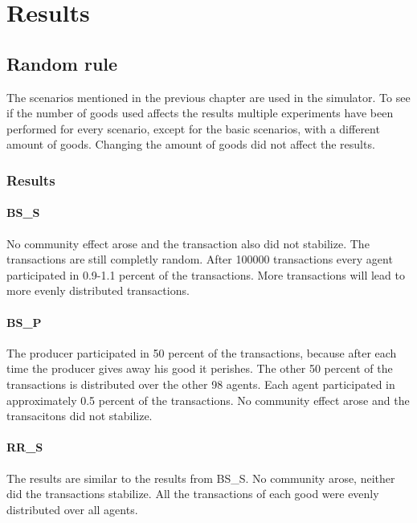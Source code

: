 \documentclass[twoside,openright]{uva-bachelor-thesis}
\begin{document}
\chapter{Results}

\section{Random rule}
The scenarios mentioned in the previous chapter are used in the simulator. To see if the number of goods used affects the results multiple experiments have been performed for every scenario, except for the basic scenarios, with a different amount of goods. Changing the amount of goods did not affect the results.
\subsection{Results}

\subsubsection{BS\_S}
No community effect arose and the transaction also did not stabilize. The transactions are still completly random. After 100000 transactions every agent participated in 0.9-1.1 percent of the transactions. More transactions will lead to more evenly distributed transactions.

\subsubsection{BS\_P}
The producer participated in 50 percent of the transactions, because after each time the producer gives away his good it perishes. The other 50 percent of the transactions is distributed over the other 98 agents. Each agent participated in approximately 0.5 percent of the transactions. No community effect arose and the transacitons did not stabilize.

\subsubsection{RR\_S}
The results are similar to the results from BS\_S. No community arose, neither did the transactions stabilize. All the transactions of each good were evenly distributed over all agents. 
\end{document}

